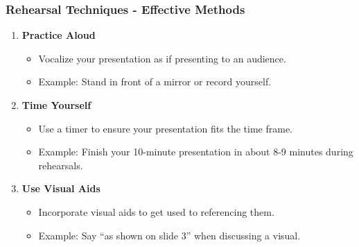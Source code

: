 \documentclass[aspectratio=169]{beamer}
\begin{document}
\begin{frame}[fragile]
    \frametitle{Rehearsal Techniques - Effective Methods}
    \begin{enumerate}
        \item \textbf{Practice Aloud}
        \begin{itemize}
            \item Vocalize your presentation as if presenting to an audience.
            \item Example: Stand in front of a mirror or record yourself.
        \end{itemize}
        
        \item \textbf{Time Yourself}
        \begin{itemize}
            \item Use a timer to ensure your presentation fits the time frame.
            \item Example: Finish your 10-minute presentation in about 8-9 minutes during rehearsals.
        \end{itemize}
        
        \item \textbf{Use Visual Aids}
        \begin{itemize}
            \item Incorporate visual aids to get used to referencing them.
            \item Example: Say “as shown on slide 3” when discussing a visual.
        \end{itemize}
    \end{enumerate}
\end{frame}
\end{document}
